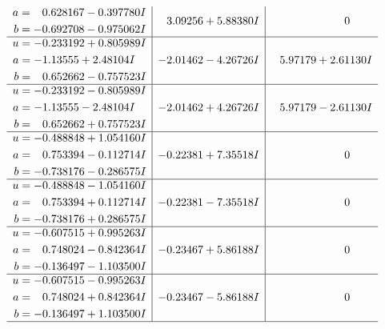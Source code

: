 \documentclass[1p]{elsarticle_modified}
\theoremstyle{definition}
\begin{document}
$$\begin{array}{c|c|c}
\begin{aligned}
a &= \phantom{-}0.628167 - 0.397780 I \\
b &= -0.692708 - 0.975062 I\end{aligned}
 & \phantom{-}3.09256 + 5.88380 I & \phantom{-0.000000 } 0 \\ \hline\begin{aligned}
u &= -0.233192 + 0.805989 I \\
a &= -1.13555 + 2.48104 I \\
b &= \phantom{-}0.652662 - 0.757523 I\end{aligned}
 & -2.01462 - 4.26726 I & \phantom{-}5.97179 + 2.61130 I \\ \hline\begin{aligned}
u &= -0.233192 - 0.805989 I \\
a &= -1.13555 - 2.48104 I \\
b &= \phantom{-}0.652662 + 0.757523 I\end{aligned}
 & -2.01462 + 4.26726 I & \phantom{-}5.97179 - 2.61130 I \\ \hline\begin{aligned}
u &= -0.488848 + 1.054160 I \\
a &= \phantom{-}0.753394 - 0.112714 I \\
b &= -0.738176 - 0.286575 I\end{aligned}
 & -0.22381 + 7.35518 I & \phantom{-0.000000 } 0 \\ \hline\begin{aligned}
u &= -0.488848 - 1.054160 I \\
a &= \phantom{-}0.753394 + 0.112714 I \\
b &= -0.738176 + 0.286575 I\end{aligned}
 & -0.22381 - 7.35518 I & \phantom{-0.000000 } 0 \\ \hline\begin{aligned}
u &= -0.607515 + 0.995263 I \\
a &= \phantom{-}0.748024 - 0.842364 I \\
b &= -0.136497 - 1.103500 I\end{aligned}
 & -0.23467 + 5.86188 I & \phantom{-0.000000 } 0 \\ \hline\begin{aligned}
u &= -0.607515 - 0.995263 I \\
a &= \phantom{-}0.748024 + 0.842364 I \\
b &= -0.136497 + 1.103500 I\end{aligned}
 & -0.23467 - 5.86188 I & \phantom{-0.000000 } 0\\
 \hline 

\end{array}$$
\end{document}
